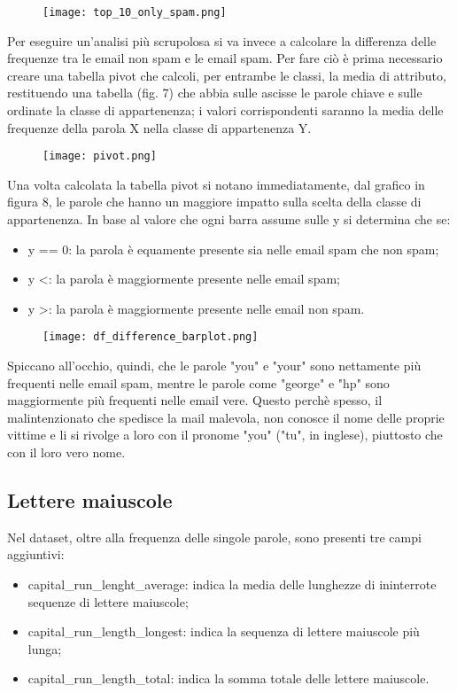 \documentclass[12pt,a4paper]{article}
\begin{document}
\begin{figure}[h]
    \texttt{[image: top\_10\_only\_spam.png]}
    \caption{}
\end{figure}
\clearpage
Per eseguire un'analisi più scrupolosa si va invece a calcolare la differenza delle frequenze tra le email non spam e le email spam.
Per fare ciò è prima necessario creare una tabella pivot che calcoli, per entrambe le classi, la media di attributo, restituendo una tabella (fig. 7) che abbia sulle ascisse le parole chiave e sulle ordinate la classe di appartenenza; i valori corrispondenti saranno la media delle frequenze della parola X nella classe di appartenenza Y.
\begin{figure}[h]
    \texttt{[image: pivot.png]}
    \caption{}
\end{figure}
Una volta calcolata la tabella pivot si notano immediatamente, dal grafico in figura 8, le parole che hanno un maggiore impatto sulla scelta della classe di appartenenza. In base al valore che ogni barra assume sulle y si determina che se:
\begin{itemize}
    \item y == 0: la parola è equamente presente sia nelle email spam che non spam;
    \item y \textless  {}: la parola è maggiormente presente nelle email spam;
    \item y \textgreater {}: la parola è maggiormente presente nelle email non spam.
\end{itemize}

\begin{figure}[h]
    \texttt{[image: df\_difference\_barplot.png]}
    \caption{}
\end{figure}

Spiccano all'occhio, quindi, che le parole "you" e "your" sono nettamente più frequenti nelle email spam, mentre le parole come "george" e "hp" sono maggiormente più frequenti nelle email vere. Questo perchè spesso, il malintenzionato che spedisce la mail malevola, non conosce il nome delle proprie vittime e li si rivolge a loro con il pronome "you" ("tu", in inglese), piuttosto che con il loro vero nome.
\subsection{Lettere maiuscole}
Nel dataset, oltre alla frequenza delle singole parole, sono presenti tre campi aggiuntivi:
\begin{itemize}
    \item capital\_run\_lenght\_average: indica la media delle lunghezze di ininterrote sequenze di lettere maiuscole;
    \item capital\_run\_length\_longest: indica la sequenza di lettere maiuscole più lunga;
    \item capital\_run\_length\_total: indica la somma totale delle lettere maiuscole.
\end{itemize}
\end{document}
